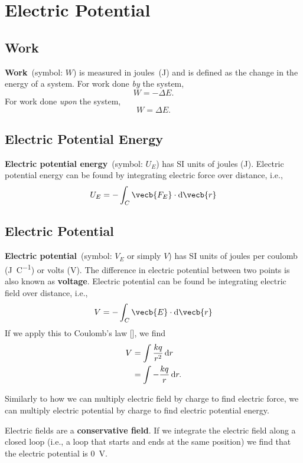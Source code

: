 \chapter{Electric Potential}

\section{Work}

\textbf{Work}~(symbol: \(W\)) is measured in joules~(\unit{\joule})
and is defined as the change in the energy of a system.
For work done \emph{by} the system,
\begin{equation}
    W = - \Delta E.
\end{equation}
For work done \emph{upon} the system,
\begin{equation}
    W = \Delta E.
\end{equation}

\section{Electric Potential Energy}

\textbf{Electric potential energy}~(symbol: \(U_E\))
has SI units of joules (\unit{\joule}).
Electric potential energy can be found by integrating electric force
over distance,
i.e.,
\begin{equation}
    U_E = - \int_C \vecb{F_E} \cdot \odif{\vecb{r}}
\end{equation}

\section{Electric Potential} \label{sec:electric-potential}

\textbf{Electric potential}~(symbol: \(V_E\) or simply \(V\))
has SI units of joules per coulomb (\unit{\joule \per \coulomb})
or volts (\unit{\volt}).
The difference in electric potential between two points
is also known as \textbf{voltage}.
Electric potential can be found be integrating electric field over distance,
i.e.,
\begin{equation}
    V = - \int_C \vecb{E} \cdot \odif{\vecb{r}}
\end{equation}
If we apply this to Coulomb's law [],
we find
\begin{gather}
    \begin{aligned}
        V &= \int \frac{k q}{r^2} \odif{r} \\
        &= \int - \frac{k q}{r} \odif{r}.
    \end{aligned}
\end{gather}

Similarly to how we can multiply electric field by charge
to find electric force,
we can multiply electric potential by charge to find electric potential energy.

Electric fields are a \textbf{conservative field}.
If we integrate the electric field along a closed loop
(i.e., a loop that starts and ends at the same position)
we find that the electric potential is \qty{0}{\volt}.
